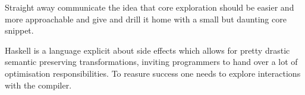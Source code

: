 Straight away communicate the idea that core exploration should be easier and more approachable and give
and drill it home with a small but daunting core snippet.
 
Haskell is a language explicit about side effects which allows for pretty drastic semantic preserving transformations,
inviting programmers to hand over a lot of optimisation responsibilities. To reasure success one needs to explore
interactions with the compiler.

